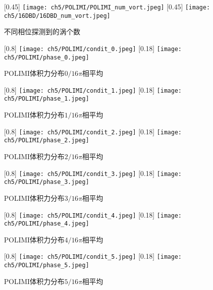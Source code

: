 \begin{figure}
  \centering
  [0.45\textwidth]
    {\texttt{[image: ch5/POLIMI/POLIMI\_num\_vort.jpeg]}}
  [0.45\textwidth]
    {\texttt{[image: ch5/16DBD/16DBD\_num\_vort.jpeg]}}
  \caption{不同相位探测到的涡个数}
\end{figure}
\begin{figure}
  \centering
  [0.8\textwidth]
    {\texttt{[image: ch5/POLIMI/condit\_0.jpeg]}}
  [0.18\textwidth]
    {\texttt{[image: ch5/POLIMI/phase\_0.jpeg]}}
  \caption{POLIMI体积力分布$0/16\pi$相平均}
\end{figure}
\begin{figure}
  \centering
  [0.8\textwidth]
    {\texttt{[image: ch5/POLIMI/condit\_1.jpeg]}}
  [0.18\textwidth]
    {\texttt{[image: ch5/POLIMI/phase\_1.jpeg]}}
  \caption{POLIMI体积力分布$1/16\pi$相平均}
\end{figure}
\begin{figure}
  \centering
  [0.8\textwidth]
    {\texttt{[image: ch5/POLIMI/condit\_2.jpeg]}}
  [0.18\textwidth]
    {\texttt{[image: ch5/POLIMI/phase\_2.jpeg]}}
  \caption{POLIMI体积力分布$2/16\pi$相平均}
\end{figure}
\begin{figure}
  \centering
  [0.8\textwidth]
    {\texttt{[image: ch5/POLIMI/condit\_3.jpeg]}}
  [0.18\textwidth]
    {\texttt{[image: ch5/POLIMI/phase\_3.jpeg]}}
  \caption{POLIMI体积力分布$3/16\pi$相平均}
\end{figure}
\begin{figure}
  \centering
  [0.8\textwidth]
    {\texttt{[image: ch5/POLIMI/condit\_4.jpeg]}}
  [0.18\textwidth]
    {\texttt{[image: ch5/POLIMI/phase\_4.jpeg]}}
  \caption{POLIMI体积力分布$4/16\pi$相平均}
\end{figure}
\begin{figure}
  \centering
  [0.8\textwidth]
    {\texttt{[image: ch5/POLIMI/condit\_5.jpeg]}}
  [0.18\textwidth]
    {\texttt{[image: ch5/POLIMI/phase\_5.jpeg]}}
  \caption{POLIMI体积力分布$5/16\pi$相平均}
\end{figure}
